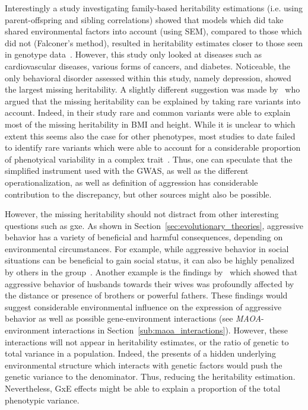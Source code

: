 Interestingly a study investigating family-based heritability estimations (i.e. using parent-offspring and sibling correlations) showed that models which did take shared environmental factors into account (using SEM), compared to those which did not (Falconer's method), resulted in heritability estimates closer to those seen in genotype data~\citet{Munoz2016a}.
However, this study only looked at diseases such as cardiovascular diseases, various forms of cancers, and diabetes.
Noticeable, the only behavioral  disorder assessed within this study, namely depression, showed the largest missing heritability.
A slightly different suggestion was made by~\citet{Yang2015} who argued that the missing heritability can be explained by taking rare variants into account.
Indeed, in their study rare and common variants were able to explain most of the missing heritability in BMI and height.
While it is unclear to which extent this seems also the case for other phenotypes, most studies to date failed to identify rare variants which were able to account for a considerable proportion of phenotyical variability in a complex trait~\cite{Chabris2015,Wray2011}.
Thus, one can speculate that the simplified instrument used with the GWAS, as well as the different operationalization, as well as definition of aggression has considerable contribution to the discrepancy, but other sources might also be possible.

However, the missing heritability should not distract from other interesting questions such as \acrfull{gxe}.
As shown in Section~\ref{sec:evolutionary_theories}, aggressive behavior has a variety of beneficial and harmful consequences, depending on environmental circumstances. 
For example, while aggressive behavior in social situations can be beneficial to gain social status, it can also be highly penalized by others in the group~\cite{Buss1997}.
Another example is the findings by~\citet{Figueredo1995} which showed that aggressive behavior of husbands towards their wives was profoundly affected by the distance or presence of brothers or powerful fathers.
These findings would suggest considerable environmental influence on the expression of aggressive behavior as well as possible gene-environment interactions (see \textit{MAOA}-environment interactions in Section~\ref{sub:maoa_interactions}).
However, these interactions will not appear in heritability estimates, or the ratio of genetic to total variance in a population.
Indeed, the presents of a hidden underlying environmental structure which interacts with genetic factors would push the genetic variance to the denominator.
Thus, reducing the heritability estimation.
Nevertheless, GxE effects might be able to explain a proportion of the total phenotypic variance.

